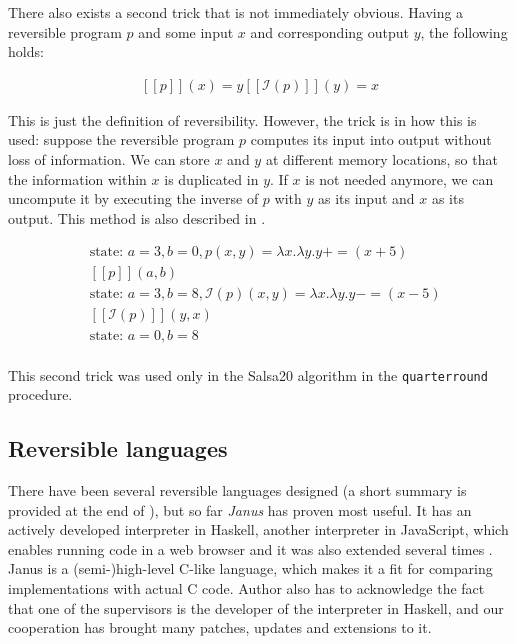 \documentclass[a4paper,10pt,openright]{memoir}
\newcommand{\inv}[1]{\ensuremath{\mathcal{I}(#1)}}
\newcommand{\exe}[1]{\ensuremath{[\![#1]\!]}}
\newcommand{\term}[1]{\textit{#1}}
\newcommand{\code}[1]{\texttt{#1}}
\begin{document}
There also exists a second trick that is not immediately obvious. Having 
a reversible program $p$ and some input $x$ and corresponding output $y$, the 
following holds:

\begin{align*}
\exe{p}(x) = y
\exe{\inv{p}}(y) = x
\end{align*}

This is just the definition of reversibility. However, the trick is in 
how this is used: suppose the reversible program $p$ computes its input 
into output without loss of information. We can store $x$ and $y$ at 
different memory locations, so that the information within $x$ is 
duplicated in $y$. If $x$ is not needed anymore, we can uncompute it by 
executing the inverse of $p$ with $y$ as its input and $x$ as its 
output. This method is also described in \cite{Bennett73}.

\begin{align*}
&\text{state: } a = 3, b = 0, p(x,y) = \lambda x. \lambda y. y += (x + 5)\\
&\exe{p}(a,b)\\
&\text{state: } a = 3, b = 8, \inv{p}(x,y) = \lambda x. \lambda y. y -= (x - 5)\\
&\exe{\inv{p}}(y,x)\\
&\text{state: } a = 0, b = 8\\
\end{align*}


This second trick was used only in the Salsa20 algorithm in the 
\code{quarterround} procedure. 

\subsection{Reversible languages}

There have been several reversible languages designed (a short summary 
is provided at the end of \cite{Yokoyama2010}), but so far \term{Janus} 
has proven most useful. It has an actively developed interpreter in 
Haskell, another interpreter in JavaScript, which enables running code 
in a web browser and it was also extended several times 
\cite{janus}. Janus is a (semi-)high-level C-like language, which 
makes it a fit for comparing implementations with actual C code. Author 
also has to acknowledge the fact that one of the supervisors is the 
developer of the interpreter in Haskell, and our cooperation has 
brought many patches, updates and extensions to it.
\end{document}
